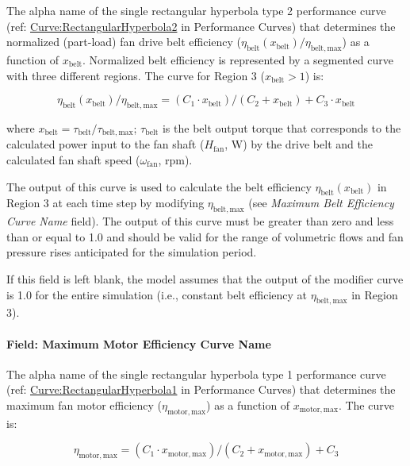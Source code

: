 The alpha name of the single rectangular hyperbola type 2 performance curve (ref: \hyperref[curverectangularhyperbola2]{Curve:RectangularHyperbola2} in Performance Curves) that determines the normalized (part-load) fan drive belt efficiency (\(\eta_{\mathrm{belt}} (x_{\mathrm{belt}}) / \eta_{\mathrm{belt, max}}\)) as a function of \(x_{\mathrm{belt}}\). Normalized belt efficiency is represented by a segmented curve with three different regions. The curve for Region 3 (\(x_{\mathrm{belt}} > 1\)) is:

\begin{equation}
  \eta_{\mathrm{belt}} ( x_{\mathrm{belt}} ) / \eta_{\mathrm{belt, max}} = ( C_1 \cdot x_{\mathrm{belt}} ) / ( C_2 + x_{\mathrm{belt}} ) + C_3 \cdot x_{\mathrm{belt}}
\end{equation}

where \(x_{\mathrm{belt}} = \tau_{\mathrm{belt}} / \tau_{\mathrm{belt, max}}\); \(\tau_{\mathrm{belt}}\) is the belt output torque that corresponds to the calculated power input to the fan shaft (\(H_{\mathrm{fan}}\), W) by the drive belt and the calculated fan shaft speed (\(\omega_{\mathrm{fan}}\), rpm).

The output of this curve is used to calculate the belt efficiency \(\eta_{\mathrm{belt}} (x_{\mathrm{belt}})\) in Region 3 at each time step by modifying \(\eta_{\mathrm{belt, max}}\) (see \emph{Maximum Belt Efficiency Curve Name} field). The output of this curve must be greater than zero and less than or equal to 1.0 and should be valid for the range of volumetric flows and fan pressure rises anticipated for the simulation period.

If this field is left blank, the model assumes that the output of the modifier curve is 1.0 for the entire simulation (i.e., constant belt efficiency at \(\eta_{\mathrm{belt, max}}\) in Region 3).

\paragraph{Field: Maximum Motor Efficiency Curve Name}\label{field-maximum-motor-efficiency-curve-name}

The alpha name of the single rectangular hyperbola type 1 performance curve (ref: \hyperref[curverectangularhyperbola1]{Curve:RectangularHyperbola1} in Performance Curves) that determines the maximum fan motor efficiency (\(\eta_{\mathrm{motor, max}}\)) as a function of \(x_{\mathrm{motor, max}}\). The curve is:

\begin{equation}
  \eta_{\mathrm{motor, max}} = (C_1 \cdot x_{\mathrm{motor, max}}) / (C_2 + x_{\mathrm{motor, max}}) + C_3
\end{equation}

